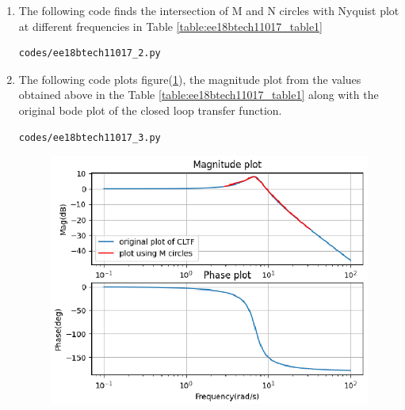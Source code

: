 \begin{enumerate}[label=\thesection.\arabic*.,ref=\thesection.\theenumi]
\item
The following code finds the intersection of M and N circles with Nyquist plot at different frequencies in Table \ref{table:ee18btech11017_table1}
\begin{lstlisting}
codes/ee18btech11017_2.py
\end{lstlisting}


\begin{table}[!ht]
\centering

\caption{}
\label{table:ee18btech11017_table1}
\end{table}


\item
The following code plots figure(\ref{fig:ee18btech11017_5}), the magnitude plot from the values obtained above in the Table \ref{table:ee18btech11017_table1} along with the original bode plot of the closed loop transfer function.
\begin{lstlisting}
codes/ee18btech11017_3.py
\end{lstlisting}

\begin{figure}[!h]
  \includegraphics[width=\columnwidth]{./figs/ee18btech11017_fig2.eps}
 \caption{}
  \label{fig:ee18btech11017_5}
\end{figure}






















\end{enumerate}

